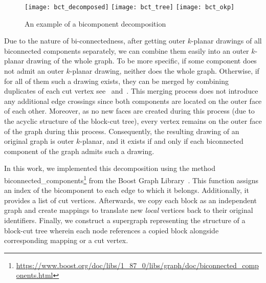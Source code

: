 \begin{figure}[tbh]
    \centering
     {
        \texttt{[image: bct\_decomposed]}
    }
    \hfill
     {
        \texttt{[image: bct\_tree]}
    }
    \hfill
    \hfill
     {
        \texttt{[image: bct\_okp]}
    }
    \caption{An example of a bicomponent decomposition}
\end{figure}

Due to the nature of bi-connectedness, after getting outer \(k\)-planar drawings of all biconnected components separately, we can combine them easily into an outer \(k\)-planar drawing of the whole graph. To be more specific, if some component does not admit an outer \(k\)-planar drawing, neither does the whole graph. Otherwise, if for all of them such a drawing exists, they can be merged by combining duplicates of each cut vertex see~ and~. This merging process does not introduce any additional edge crossings since both components are located on the outer face of each other. Moreover, as no new faces are created during this process (due to the acyclic structure of the block-cut tree), every vertex remains on the outer face of the graph during this process. Consequently, the resulting drawing of an original graph is outer \(k\)-planar, and it exists if and only if each biconnected component of the graph admits such a drawing.

In this work, we implemented this decomposition using the method \textsf{bi\-connec\-ted\_compo\-nents}\footnote{\url{https://www.boost.org/doc/libs/1_87_0/libs/graph/doc/biconnected_components.html}} from the Boost Graph Library~\cite{boost}. This function assigns an index of the bicomponent to each edge to which it belongs. Additionally, it provides a list of cut vertices. Afterwards, we copy each block as an independent graph and create mappings to translate new \emph{local} vertices back to their original identifiers. Finally, we construct a supergraph representing the structure of a block-cut tree wherein each node references a copied block alongside corresponding mapping or a cut vertex.

